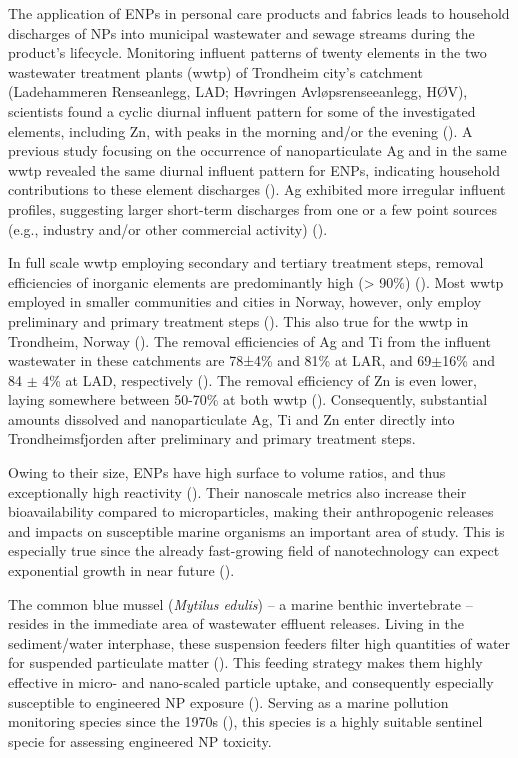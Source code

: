 The application of \acrshort{ENPs} in personal care products and fabrics leads to household discharges of NPs into municipal wastewater and sewage streams during the product’s lifecycle. Monitoring influent patterns of twenty elements in the two wastewater treatment plants (\acrshort{wwtp}) of Trondheim city’s catchment (Ladehammeren Renseanlegg, LAD; Høvringen Avløpsrenseeanlegg, HØV), scientists found a cyclic diurnal influent pattern for some of the investigated elements, including Zn, with peaks in the morning and/or the evening (\cite{Farkas2020}). A previous study focusing on the occurrence of nanoparticulate \acrshort{Ag} and  in the same \acrshort{wwtp} revealed the same diurnal influent pattern for  \acrshort{ENPs}, indicating household contributions to these element discharges (\cite{Polesel2018}). \acrshort{Ag} exhibited more irregular influent profiles, suggesting larger short-term discharges from one or a few point sources (e.g., industry and/or other commercial activity) (\cite{Polesel2018}). 

In full scale \acrshort{wwtp} employing secondary and tertiary treatment steps, removal efficiencies of inorganic elements are predominantly high (> 90\%) (\cite{Cantinho2016}). Most \acrshort{wwtp} employed in smaller communities and cities in Norway, however, only employ preliminary and primary treatment steps (\cite{Berge2018}). This also true for the \acrshort{wwtp} in Trondheim, Norway (\cite{Farkas2020}). The removal efficiencies of \acrshort{Ag} and Ti from the influent wastewater in these catchments are 78±4\% and 81\% at LAR, and 69$\pm$16\% and 84 $\pm$ 4\% at LAD, respectively (\cite{Polesel2018}). The removal efficiency of Zn is even lower, laying somewhere between 50-70\% at both \acrshort{wwtp} (\cite{Farkas2020}). Consequently, substantial amounts dissolved and nanoparticulate \acrshort{Ag}, Ti and Zn enter directly into Trondheimsfjorden after preliminary and primary treatment steps. 

Owing to their size, \acrshort{ENPs} have high surface to volume ratios, and thus exceptionally high reactivity (\cite{Warheit2018}). Their nanoscale metrics also increase their bioavailability compared to microparticles, making their anthropogenic releases and impacts on susceptible marine organisms an important area of study. This is especially true since the already fast-growing field of nanotechnology can expect exponential growth in near future (\cite{Talebian2021}). 

The common blue mussel (\emph{Mytilus edulis}) – a marine benthic invertebrate – resides in the immediate area of wastewater effluent releases. Living in the sediment/water interphase, these suspension feeders filter high quantities of water for suspended particulate matter (\cite{Beyer2017b}). This feeding strategy makes them highly effective in micro- and nano-scaled particle uptake, and consequently especially susceptible to engineered NP exposure (\cite{Canesi2012}). Serving as a marine pollution monitoring species since the 1970s (\cite{Goldberg1975}), this species is a highly suitable sentinel specie for assessing engineered NP toxicity.

